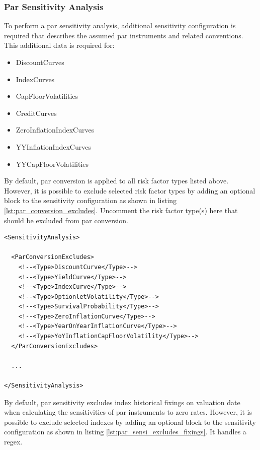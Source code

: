 



\subsubsection*{Par Sensitivity Analysis}

To perform a par sensitivity analysis, additional sensitivity configuration is required that describes the assumed par instruments and related conventions.
This additional data is required for:
\begin{itemize}
\item DiscountCurves
\item IndexCurves
\item CapFloorVolatilities
\item CreditCurves
\item ZeroInflationIndexCurves
\item YYInflationIndexCurves
\item YYCapFloorVolatilities
\end{itemize}

By default, par conversion is applied to all risk factor types listed above. However, it is possible to exclude
selected risk factor types by adding an optional block to the sensitivity configuration as shown in listing \ref{lst:par_conversion_excludes}. Uncomment the risk factor type(s) here that should be excluded from par conversion.

\begin{longlisting}
  \begin{verbatim}
<SensitivityAnalysis>

  <ParConversionExcludes>
    <!--<Type>DiscountCurve</Type>-->
    <!--<Type>YieldCurve</Type>-->
    <!--<Type>IndexCurve</Type>-->
    <!--<Type>OptionletVolatility</Type>-->
    <!--<Type>SurvivalProbability</Type>-->
    <!--<Type>ZeroInflationCurve</Type>-->
    <!--<Type>YearOnYearInflationCurve</Type>-->
    <!--<Type>YoYInflationCapFloorVolatility</Type>-->
  </ParConversionExcludes>

  ...

</SensitivityAnalysis>
\end{verbatim}
\caption{Par conversion excludes}
\label{lst:par_conversion_excludes}
\end{longlisting}

By default, par sensitivity excludes index historical fixings on valuation date when calculating the sensitivities of par instruments to zero rates. However, it is possible to exclude
selected indexes by adding an optional block to the sensitivity configuration as shown in listing \ref{lst:par_sensi_excludes_fixings}. It handles a regex.

